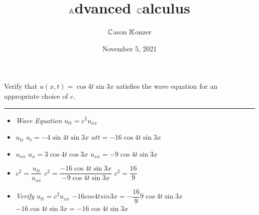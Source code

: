 \documentclass[10pt]{article}
\title{$\mathbb{A}$dvanced $\mathbb{C}$alculus}
\author{$\mathbb{C}$ason $\mathbb{K}$onzer}
\date{November 5, 2021}
\begin{document}
\maketitle

\newpage

\section{\underline{}}
\label{sec: Problem 1}

\noindent
Verify that $ u(x,t) = \cos{4t}\sin{3x} $ satisfies the wave equation for an appropriate choice of $ c $. \\
\vspace{2.5mm}

\hrule

\vspace{7.5mm}

\begin{itemize}
    \item \textit{Wave Equation} $ u_{tt} = c^2u_{xx} $
    \item $ u_{tt} $
    \subitem $ u_{t} = -4\sin{4t}\sin{3x} $
    \subitem $ u{tt} = -16\cos{4t}\sin{3x} $
    \item $ u_{xx} $
    \subitem $ u_{x} = 3\cos{4t}\cos{3x} $
    \subitem $ u_{xx} = -9\cos{4t}\sin{3x} $
    \item $ \displaystyle c^2 = \dfrac{u_{tt}}{u_{xx}} $
    \subitem $ \displaystyle c^2 = \dfrac{-16\cos{4t}\sin{3x}}{-9\cos{4t}\sin{3x}} $
    \subitem $ \displaystyle c^2 = \dfrac{16}{9} $
    \item \textit{Verify} $ u_{tt} = c^2u_{xx} $
    \subitem $ \displaystyle -16cos{4t}sin{3x} = -\dfrac{16}{9}9\cos{4t}\sin{3x} $
    \subitem $ -16\cos{4t}\sin{3x} = -16\cos{4t}\sin{3x} $
\end{itemize}

\newpage

\section{\underline{}}
\label{sec: Problem 2}
\end{document}
